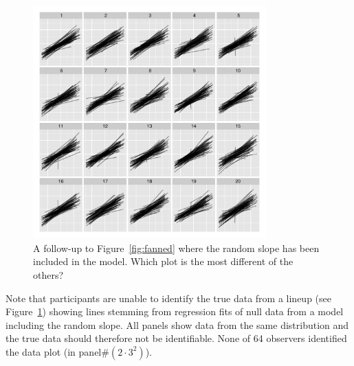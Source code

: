 \documentclass[12pt]{article} %
\newcommand{\hh}[1]{{\color{orange} #1}}
\newcommand{\alnote}[1]{\todo[inline,color=green!40]{#1}} %
\newcommand{\hhnote}[1]{\todo[inline,color=orange!40]{#1}}
\begin{document}
\begin{figure}
	\centering
	\includegraphics[width = 0.8\textwidth]{normexam_fanned_withslope_lineup18}
	\caption{\label{fig:fanned2} A follow-up to Figure~\ref{fig:fanned} where the random slope has been included in the model. Which plot is the most different of the others?}
\end{figure}

%

\hh{Note that participants are unable to identify the true data from a lineup (see  Figure~\ref{fig:fanned2}) showing lines stemming from regression fits of null data from a model including the random slope.  All panels show data from the same distribution and the true data should therefore not be identifiable.  None of 64 observers identified the data plot (in panel\#$(2\cdot 3^2)$). }
\end{document}
